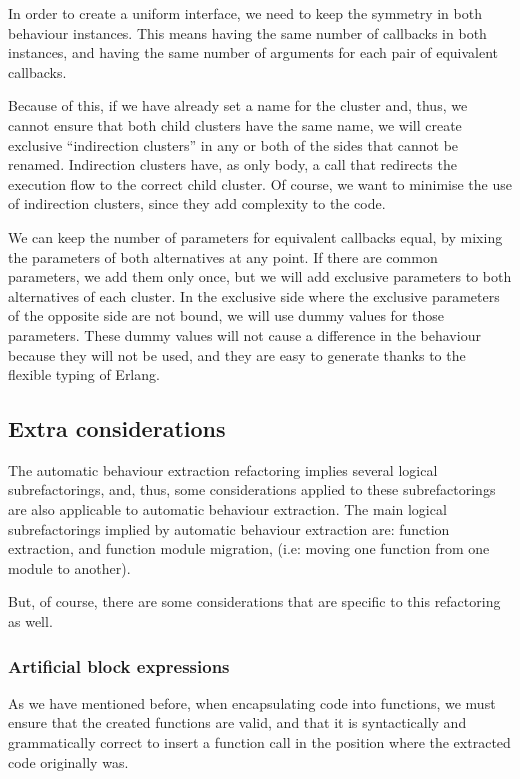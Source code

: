 In order to create a uniform interface, we need to keep the symmetry
in both behaviour instances. This means having the same number of
callbacks in both instances, and having the same number of arguments
for each pair of equivalent callbacks.

Because of this, if we have already set a name for the cluster and,
thus, we cannot ensure that both child clusters have the same name,
we will create exclusive ``indirection clusters'' in any or both
of the sides that cannot be renamed. Indirection clusters have, as
only body, a call that redirects the execution flow to the correct
child cluster. Of course, we want to minimise the use of indirection
clusters, since they add complexity to the code.

We can keep the number of parameters for equivalent callbacks equal,
by mixing the parameters of both alternatives at any point. If there
are common parameters, we add them only once, but we will add exclusive
parameters to both alternatives of each cluster. In the exclusive
side where the exclusive parameters of the opposite side are not bound,
we will use dummy values for those parameters. These dummy values
will not cause a difference in the behaviour because they will not
be used, and they are easy to generate thanks to the flexible typing
of Erlang.

\subsection{Extra considerations}

The automatic behaviour extraction refactoring implies several logical
subrefactorings, and, thus, some considerations applied to these subrefactorings
are also applicable to automatic behaviour extraction. The main logical
subrefactorings implied by automatic behaviour extraction are: function
extraction, and function module migration, (i.e: moving one function
from one module to another).

But, of course, there are some considerations that are specific to
this refactoring as well.

\subsubsection{Artificial block expressions\label{sub:artificial-block-expressions}}

As we have mentioned before, when encapsulating code into functions,
we must ensure that the created functions are valid, and that it is
syntactically and grammatically correct to insert a function call
in the position where the extracted code originally was.

